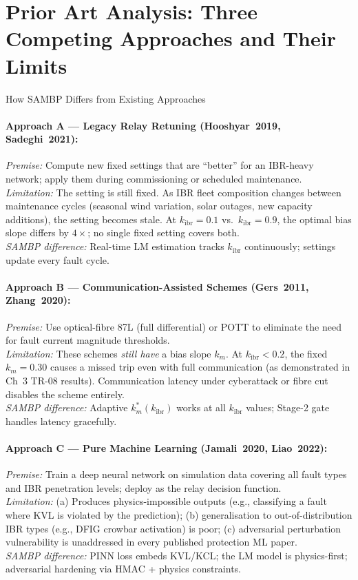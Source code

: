 \documentclass[12pt,a4paper]{article}
\newcommand{\kibr}{k_\mathrm{ibr}}
\newcommand{\km}{k_m}
\begin{document}
\section{Prior Art Analysis: Three Competing Approaches and Their Limits}

\begin{archbox}{How SAMBP Differs from Existing Approaches}

\paragraph{Approach A --- Legacy Relay Retuning (Hooshyar~2019, Sadeghi~2021):}
\textit{Premise:} Compute new fixed settings that are ``better'' for an IBR-heavy
network; apply them during commissioning or scheduled maintenance.\\
\textit{Limitation:} The setting is still fixed.  As IBR fleet composition
changes between maintenance cycles (seasonal wind variation, solar outages,
new capacity additions), the setting becomes stale.  At $\kibr=0.1$ vs.\
$\kibr=0.9$, the optimal bias slope differs by $4\times$; no single fixed
setting covers both.\\
\textit{SAMBP difference:} Real-time LM estimation tracks $\kibr$ continuously;
settings update every fault cycle.

\paragraph{Approach B --- Communication-Assisted Schemes (Gers~2011, Zhang~2020):}
\textit{Premise:} Use optical-fibre 87L (full differential) or POTT to
eliminate the need for fault current magnitude thresholds.\\
\textit{Limitation:} These schemes \emph{still have} a bias slope $\km$.
At $\kibr < 0.2$, the fixed $\km = 0.30$ causes a missed trip even with
full communication (as demonstrated in Ch~3 TR-08 results).  Communication
latency under cyberattack or fibre cut disables the scheme entirely.\\
\textit{SAMBP difference:} Adaptive $\km^*(\kibr)$ works at all $\kibr$
values; Stage-2 gate handles latency gracefully.

\paragraph{Approach C --- Pure Machine Learning (Jamali~2020, Liao~2022):}
\textit{Premise:} Train a deep neural network on simulation data covering
all fault types and IBR penetration levels; deploy as the relay decision function.\\
\textit{Limitation:} (a) Produces physics-impossible outputs (e.g., classifying
a fault where KVL is violated by the prediction); (b) generalisation to
out-of-distribution IBR types (e.g., DFIG crowbar activation) is poor;
(c) adversarial perturbation vulnerability is unaddressed in every published
protection ML paper.\\
\textit{SAMBP difference:} PINN loss embeds KVL/KCL; the LM model is physics-first;
adversarial hardening via HMAC + physics constraints.
\end{archbox}
\end{document}
